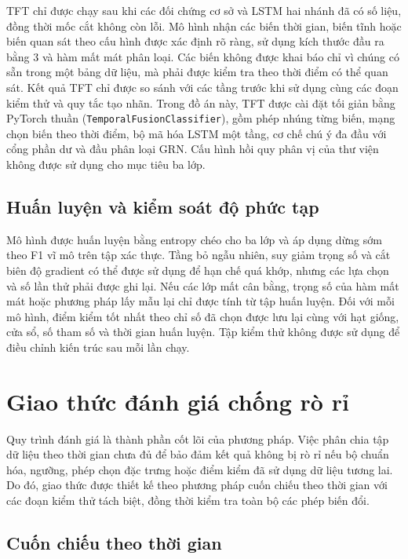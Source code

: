 \documentclass[12pt, a4paper, oneside]{report}
\begin{document}
TFT chỉ được chạy sau khi các đối chứng cơ sở và LSTM hai nhánh đã có số liệu, đồng
thời mốc cắt không còn lỗi. Mô hình nhận các biến thời gian, biến tĩnh hoặc biến quan
sát theo cấu hình được xác định rõ ràng, sử dụng kích thước đầu ra bằng 3 và hàm mất
mát phân loại. Các biến không được khai báo chỉ vì chúng có sẵn trong một bảng dữ
liệu, mà phải được kiểm tra theo thời điểm có thể quan sát. Kết quả TFT chỉ được so
sánh với các tầng trước khi sử dụng cùng các đoạn kiểm thử và quy tắc tạo nhãn. Trong
đồ án này, TFT được cài đặt tối giản bằng PyTorch thuần
(\texttt{TemporalFusionClassifier}), gồm phép nhúng từng biến, mạng chọn biến theo
thời điểm, bộ mã hóa LSTM một tầng, cơ chế chú ý đa đầu với cổng phần dư và đầu phân
loại GRN. Cấu hình hồi quy phân vị của thư viện không được sử dụng cho mục tiêu ba
lớp.

\subsection{Huấn luyện và kiểm soát độ phức tạp}

Mô hình được huấn luyện bằng entropy chéo cho ba lớp và áp dụng dừng sớm theo F1 vĩ
mô trên tập xác thực. Tầng bỏ ngẫu nhiên, suy giảm trọng số và cắt biên độ gradient
có thể được sử dụng để hạn chế quá khớp, nhưng các lựa chọn và số lần thử phải được
ghi lại. Nếu các lớp mất cân bằng, trọng số của hàm mất mát hoặc phương pháp lấy mẫu
lại chỉ được tính từ tập huấn luyện. Đối với mỗi mô hình, điểm kiểm tốt nhất theo chỉ
số đã chọn được lưu lại cùng với hạt giống, cửa sổ, số tham số và thời gian huấn
luyện. Tập kiểm thử không được sử dụng để điều chỉnh kiến trúc sau mỗi lần chạy.
\section{Giao thức đánh giá chống rò rỉ}
\label{sec:pp-danh-gia}

Quy trình đánh giá là thành phần cốt lõi của phương pháp. Việc phân chia tập dữ liệu
theo thời gian chưa đủ để bảo đảm kết quả không bị rò rỉ nếu bộ chuẩn hóa, ngưỡng,
phép chọn đặc trưng hoặc điểm kiểm đã sử dụng dữ liệu tương lai. Do đó, giao thức
được thiết kế theo phương pháp cuốn chiếu theo thời gian với các đoạn kiểm thử tách
biệt, đồng thời kiểm tra toàn bộ các phép biến đổi.

\subsection{Cuốn chiếu theo thời gian}
\end{document}
